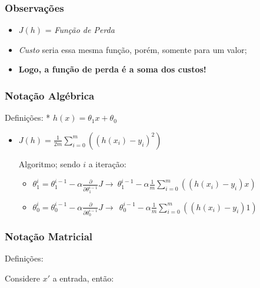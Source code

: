 \documentclass[12pt]{article}
\providecommand{\tightlist}{%
\setlength{\itemsep}{0pt}\setlength{\parskip}{0pt}}
\begin{document}
\hypertarget{observauxe7uxf5es}{%
\subsubsection{Observações}\label{observauxe7uxf5es}}

\begin{itemize}
\item
  \(J(h)\) = \emph{Função de Perda}
\item
  \emph{Custo} seria essa mesma função, porém, somente para um valor;
\item
  \textbf{Logo, a função de perda é a soma dos custos!}
\end{itemize}

\hypertarget{notauxe7uxe3o-alguxe9brica}{%
\subsubsection{Notação Algébrica}\label{notauxe7uxe3o-alguxe9brica}}

Definições: * \(h(x)=\theta_1x+\theta_0\)

\begin{itemize}
\item
  \(J(h)=\frac{1}{2m}\sum\limits_{i=0}^{m}((h(x_i)-y_i)^2)\)

  Algoritmo; sendo \(i\) a iteração:

  \begin{itemize}
  \tightlist
  \item
    \(\theta^i_1= \theta_1^{i-1} - \alpha \frac{\partial}{\partial \theta_1^{i-1}}J \to ~  \theta_1^{i-1} - \alpha \frac{1}{m}\sum\limits_{i=0}^{m}((h(x_i)-y_i)x)\)
  \item
    \(\theta^i_0= \theta_0^{i-1} - \alpha \frac{\partial}{\partial \theta_0^{i-1}}J \to ~  \ \theta_0^{i-1} - \alpha \frac{1}{m}\sum\limits_{i=0}^{m}((h(x_i)-y_i)1)\)
  \end{itemize}
\end{itemize}

\hypertarget{notauxe7uxe3o-matricial}{%
\subsubsection{Notação Matricial}\label{notauxe7uxe3o-matricial}}

Definições:

Considere \(x'\) a entrada, então:
\end{document}
